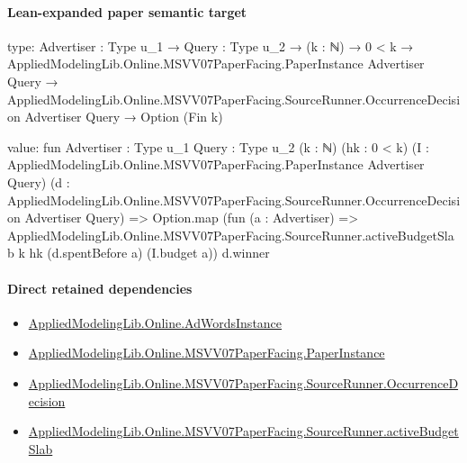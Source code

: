 \documentclass[10pt]{article}
\begin{document}
\paragraph{Lean-expanded paper semantic target}
\begin{ReviewVerbatim}
type:
{Advertiser : Type u_1} →
  {Query : Type u_2} →
    (k : ℕ) →
      0 < k →
        AppliedModelingLib.Online.MSVV07PaperFacing.PaperInstance Advertiser Query →
          AppliedModelingLib.Online.MSVV07PaperFacing.SourceRunner.OccurrenceDecision Advertiser Query → Option (Fin k)

value:
fun {Advertiser : Type u_1} {Query : Type u_2} (k : ℕ) (hk : 0 < k)
    (I : AppliedModelingLib.Online.MSVV07PaperFacing.PaperInstance Advertiser Query)
    (d : AppliedModelingLib.Online.MSVV07PaperFacing.SourceRunner.OccurrenceDecision Advertiser Query) =>
  Option.map
    (fun (a : Advertiser) =>
      AppliedModelingLib.Online.MSVV07PaperFacing.SourceRunner.activeBudgetSlab k hk (d.spentBefore a) (I.budget a))
    d.winner
\end{ReviewVerbatim}

\paragraph{Direct retained dependencies}
\begin{itemize}\raggedright
\item \hyperlink{governing-declaration-e5ce49672bf26ab1}{Applied\allowbreak{}Modeling\allowbreak{}Lib.\allowbreak{}Online.\allowbreak{}Ad\allowbreak{}Words\allowbreak{}Instance}
\item \hyperlink{governing-declaration-11907576ec71eeb5}{Applied\allowbreak{}Modeling\allowbreak{}Lib.\allowbreak{}Online.\allowbreak{}MSVV07\allowbreak{}Paper\allowbreak{}Facing.\allowbreak{}Paper\allowbreak{}Instance}
\item \hyperlink{governing-declaration-97202a3921106ed9}{Applied\allowbreak{}Modeling\allowbreak{}Lib.\allowbreak{}Online.\allowbreak{}MSVV07\allowbreak{}Paper\allowbreak{}Facing.\allowbreak{}Source\allowbreak{}Runner.\allowbreak{}Occurrence\allowbreak{}Decision}
\item \hyperlink{paper-prerequisite-84b93a2351446dd2}{Applied\allowbreak{}Modeling\allowbreak{}Lib.\allowbreak{}Online.\allowbreak{}MSVV07\allowbreak{}Paper\allowbreak{}Facing.\allowbreak{}Source\allowbreak{}Runner.\allowbreak{}active\allowbreak{}Budget\allowbreak{}Slab}
\end{itemize}
\end{document}
